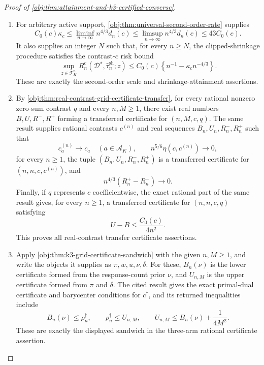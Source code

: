 \begin{proof}[Proof of \cref{obj:thm:attainment-and-k3-certified-converse}]
\begin{enumerate}
\item For arbitrary active support, \cref{obj:thm:universal-second-order-rate} supplies
\[
C_0(c)\kappa_c
\le
\liminf_{n\to\infty} n^{4/3}d_n(c)
\le
\limsup_{n\to\infty} n^{4/3}d_n(c)
\le
43C_0(c).
\]
It also supplies an integer \(N\) such that, for every \(n\ge N\), the clipped-shrinkage procedure satisfies the contrast-\(c\) risk bound
\[
\sup_{z\in\mathcal T_K^n}
R_n^c(\mathcal D^\star,\widehat\tau_n^{\mathrm{sh}};z)
\le
C_0(c)\left\{n^{-1}-\kappa_c n^{-4/3}\right\}.
\]
These are exactly the second-order scale and shrinkage-attainment assertions.

\item By \cref{obj:thm:real-contrast-grid-certificate-transfer}, for every rational nonzero zero-sum contrast \(q\) and every \(n,M\ge 1\), there exist real numbers \(B,U,R^-,R^+\) forming a transferred certificate for \((n,M,c,q)\). The same result supplies rational contrasts \(c^{(n)}\) and real sequences \(B_n,U_n,R_n^-,R_n^+\) such that
\[
c^{(n)}_a\to c_a\quad(a\in\mathcal A_K),
\qquad
n^{5/6}\eta(c,c^{(n)})\to 0,
\]
for every \(n\ge 1\), the tuple \((B_n,U_n,R_n^-,R_n^+)\) is a transferred certificate for \((n,n,c,c^{(n)})\), and
\[
n^{4/3}(R_n^+-R_n^-)\to 0.
\]
Finally, if \(q\) represents \(c\) coefficientwise, the exact rational part of the same result gives, for every \(n\ge 1\), a transferred certificate for \((n,n,c,q)\) satisfying
\[
U-B\le \frac{C_0(c)}{4n^2}.
\]
This proves all real-contrast transfer certificate assertions.

\item Apply \cref{obj:thm:k3-grid-certificate-sandwich} with the given \(n,M\ge 1\), and write the objects it supplies as \(\pi,w,u,\nu,\delta\). For these, \(B_n(\nu)\) is the lower certificate formed from the response-count prior \(\nu\), and \(U_{n,M}\) is the upper certificate formed from \(\pi\) and \(\delta\). The cited result gives the exact primal-dual certificate and barycenter conditions for \(c^\dagger\), and its returned inequalities include
\[
B_n(\nu)\le \rho_n^\dagger,
\qquad
\rho_n^\dagger\le U_{n,M},
\qquad
U_{n,M}\le B_n(\nu)+\frac{1}{4M^2}.
\]
These are exactly the displayed sandwich in the three-arm rational certificate assertion.
\end{enumerate}
\end{proof}
